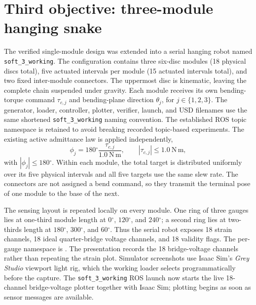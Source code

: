 \documentclass[11pt,letterpaper]{article}
\newcommand{\degrees}{\ensuremath{^{\circ}}}
\begin{document}
\section{Third objective: three-module hanging snake}
The verified single-module design was extended into a serial hanging robot
named \texttt{soft\_3\_working}. The configuration contains three six-disc
modules (18 physical discs total), five actuated intervals per module
(15 actuated intervals total), and two fixed inter-module connectors. The
uppermost disc is kinematic, leaving the complete chain suspended under
gravity. Each module receives its own bending-torque command $\tau_{c,j}$ and
bending-plane direction $\theta_j$, for $j\in\{1,2,3\}$. The generator,
loader, controller, plotter, verifier, launch, and USD filenames use
the same shortened \texttt{soft\_3\_working} naming convention. The established
 ROS topic namespace is retained to avoid breaking
recorded topic-based experiments. The existing active
admittance law is applied independently,
\begin{equation}
  \phi_j=180\degrees{}\frac{\tau_{c,j}}{1.0~\mathrm{N\,m}},
  \qquad |\tau_{c,j}|\leq1.0~\mathrm{N\,m},
\end{equation}
with $|\phi_j|\leq180\degrees{}$. Within each module, the total target is
distributed uniformly over its five physical intervals and all five targets
use the same slew rate. The connectors are not assigned a bend command, so
they transmit the terminal pose of one module to the base of the next.

The sensing layout is repeated locally on every module. One ring of three
gauges lies at one-third module length at $0\degrees{}$, $120\degrees{}$, and
$240\degrees{}$; a second ring lies at two-thirds length at $180\degrees{}$,
$300\degrees{}$, and $60\degrees{}$. Thus the serial robot exposes 18 strain
channels, 18 ideal quarter-bridge voltage channels, and 18 validity flags.
The per-gauge namespace is
.
The presentation records the 18 bridge-voltage channels rather than repeating
the strain plot. Simulator screenshots use Isaac Sim's \emph{Grey Studio}
viewport light rig, which the working loader selects programmatically before
the capture. The \texttt{soft\_3\_working} ROS launch now starts the live
18-channel bridge-voltage plotter together with Isaac Sim; plotting begins as
soon as sensor messages are available.
\end{document}

